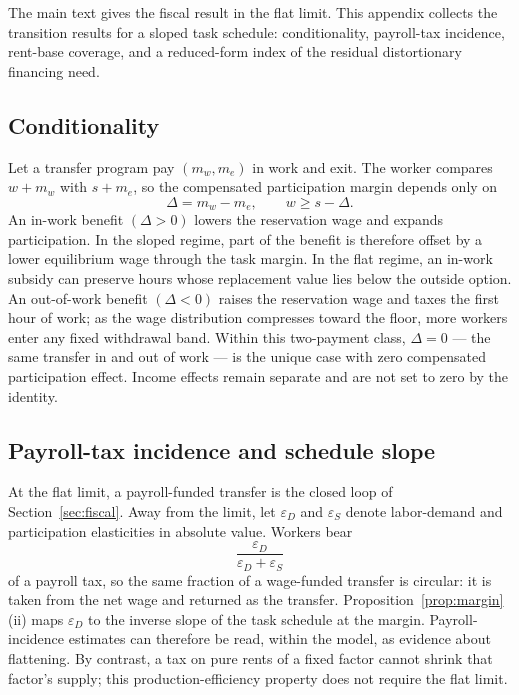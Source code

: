 \documentclass[12pt]{article}
\theoremstyle{plain}
\begin{document}
The main text gives the fiscal result in the flat limit. This appendix collects the transition results for a sloped task schedule: conditionality, payroll-tax incidence, rent-base coverage, and a reduced-form index of the residual distortionary financing need.

\subsection{Conditionality}\label{app:conditionality}

Let a transfer program pay $(m_w,m_e)$ in work and exit. The worker compares $w+m_w$ with $s+m_e$, so the compensated participation margin depends only on
\[
\Delta=m_w-m_e,
\qquad
w\ge s-\Delta.
\]
An in-work benefit $(\Delta>0)$ lowers the reservation wage and expands participation. In the sloped regime, part of the benefit is therefore offset by a lower equilibrium wage through the task margin. In the flat regime, an in-work subsidy can preserve hours whose replacement value lies below the outside option. An out-of-work benefit $(\Delta<0)$ raises the reservation wage and taxes the first hour of work; as the wage distribution compresses toward the floor, more workers enter any fixed withdrawal band. Within this two-payment class, $\Delta=0$ --- the same transfer in and out of work --- is the unique case with zero compensated participation effect. Income effects remain separate and are not set to zero by the identity.

\subsection{Payroll-tax incidence and schedule slope}\label{app:funding}

At the flat limit, a payroll-funded transfer is the closed loop of Section~\ref{sec:fiscal}. Away from the limit, let $\varepsilon_D$ and $\varepsilon_S$ denote labor-demand and participation elasticities in absolute value. Workers bear
\[
\frac{\varepsilon_D}{\varepsilon_D+\varepsilon_S}
\]
of a payroll tax, so the same fraction of a wage-funded transfer is circular: it is taken from the net wage and returned as the transfer. Proposition~\ref{prop:margin}(ii) maps $\varepsilon_D$ to the inverse slope of the task schedule at the margin. Payroll-incidence estimates can therefore be read, within the model, as evidence about flattening. By contrast, a tax on pure rents of a fixed factor cannot shrink that factor's supply; this production-efficiency property does not require the flat limit.
\end{document}
